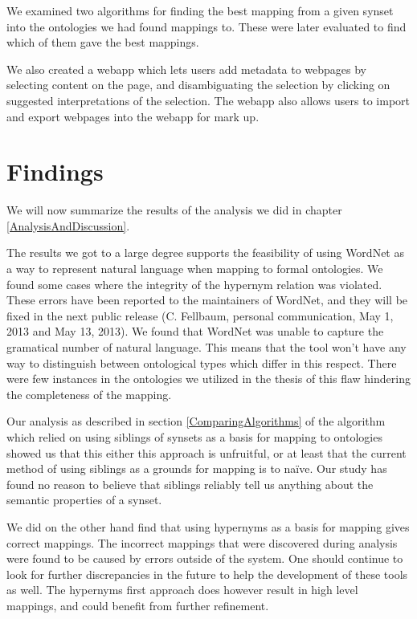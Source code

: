 We examined two algorithms for finding the best mapping from a given synset into the ontologies we had found mappings to.
These were later evaluated to find which of them gave the best mappings.

We also created a webapp which lets users add metadata to webpages by selecting content on the page,
and disambiguating the selection by clicking on suggested interpretations of the selection.
The webapp also allows users to import and export webpages into the webapp for mark up.

\section{Findings}
We will now summarize the results of the analysis we did in chapter \ref{AnalysisAndDiscussion}.

The results we got to a large degree supports the feasibility of using WordNet as a way to represent natural language
when mapping to formal ontologies.
We found some cases where the integrity of the hypernym relation was violated.
These errors have been reported to the maintainers of WordNet, and they will be fixed in the next public  release (C. Fellbaum, personal communication, May 1, 2013 and May 13, 2013).
We found that WordNet was unable to capture the gramatical number of natural language.
This means that the tool won't have any way to distinguish between ontological types which differ in this respect.
There were few instances in the ontologies we utilized in the thesis of this flaw hindering the completeness of the mapping.

Our analysis as described in section \ref{ComparingAlgorithms} of the algorithm which relied on
using siblings of synsets as a basis for mapping to ontologies showed us that this either this approach is unfruitful,
or at least that the current method of using siblings as a grounds for mapping is to naïve.
Our study has found no reason to believe that siblings reliably tell us anything about the semantic properties of a synset.

We did on the other hand find that using hypernyms as a basis for mapping gives correct mappings.
The incorrect mappings that were discovered during analysis were found to be caused by errors outside of the system.
One should continue to look for further discrepancies in the future to help the development of these tools as well.
The hypernyms first approach does however result in high level mappings, and could benefit from further refinement.


